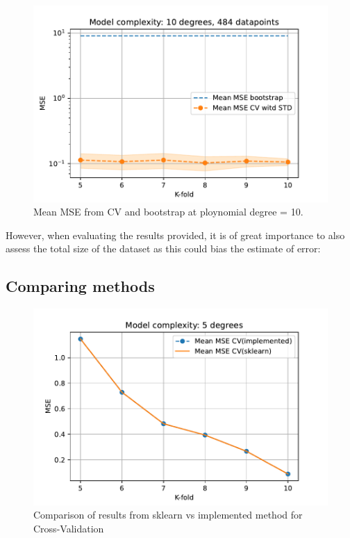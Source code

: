 \documentclass[11pt, a4paper]{article}
\begin{document}
\begin{figure}[h]
  \centering
  \includegraphics[scale=0.75]{figures/EX3_mse_cv_boot10.pdf}
  \caption{\label{fig:?}Mean MSE from CV and bootstrap at ploynomial degree = 10.}
\end{figure}


However, when evaluating the results provided, it is of great importance to also assess the total size of the dataset as this could bias the estimate of error:

\subsection*{Comparing methods}



\begin{figure}[h]
  \centering
  \includegraphics[scale=0.75]{figures/EX3_sk_vs_implemented_CV.pdf}
  \caption{\label{fig:?}Comparison of results from sklearn vs implemented method for Cross-Validation}
\end{figure}
\end{document}
